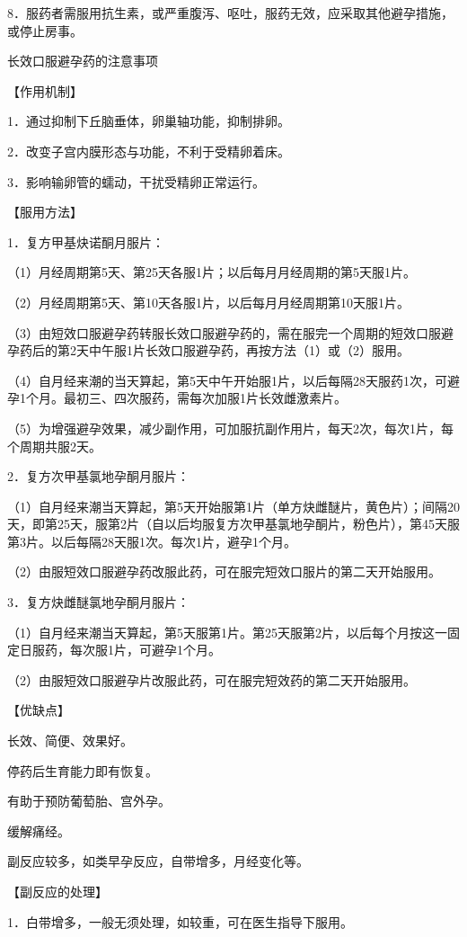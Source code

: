 \documentclass[12pt,UTF8,openany]{ctexbook}
\begin{document}
8．服药者需服用抗生素，或严重腹泻、呕吐，服药无效，应采取其他避孕措施，或停止房事。





长效口服避孕药的注意事项


【作用机制】

1．通过抑制下丘脑垂体，卵巢轴功能，抑制排卵。

2．改变子宫内膜形态与功能，不利于受精卵着床。

3．影响输卵管的蠕动，干扰受精卵正常运行。

【服用方法】

1．复方甲基炔诺酮月服片：

（1）月经周期第5天、第25天各服1片；以后每月月经周期的第5天服1片。

（2）月经周期第5天、第10天各服1片，以后每月月经周期第10天服1片。

（3）由短效口服避孕药转服长效口服避孕药的，需在服完一个周期的短效口服避孕药后的第2天中午服1片长效口服避孕药，再按方法（1）或（2）服用。

（4）自月经来潮的当天算起，第5天中午开始服1片，以后每隔28天服药1次，可避孕1个月。最初三、四次服药，需每次加服1片长效雌激素片。

（5）为增强避孕效果，减少副作用，可加服抗副作用片，每天2次，每次1片，每个周期共服2天。

2．复方次甲基氯地孕酮月服片：

（1）自月经来潮当天算起，第5天开始服第1片（单方炔雌醚片，黄色片）；间隔20天，即第25天，服第2片（自以后均服复方次甲基氯地孕酮片，粉色片），第45天服第3片。以后每隔28天服1次。每次1片，避孕1个月。

（2）由服短效口服避孕药改服此药，可在服完短效口服片的第二天开始服用。

3．复方炔雌醚氯地孕酮月服片：

（1）自月经来潮当天算起，第5天服第1片。第25天服第2片，以后每个月按这一固定日服药，每次服1片，可避孕1个月。

（2）由服短效口服避孕片改服此药，可在服完短效药的第二天开始服用。

【优缺点】

长效、简便、效果好。

停药后生育能力即有恢复。

有助于预防葡萄胎、宫外孕。

缓解痛经。

副反应较多，如类早孕反应，自带增多，月经变化等。

【副反应的处理】

1．白带增多，一般无须处理，如较重，可在医生指导下服用。
\end{document}
